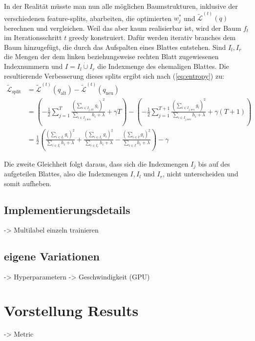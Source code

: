 \documentclass[a4paper,12pt]{scrartcl}
\newcommand{\LL}{\ensuremath{\mathcal{L}}}
\begin{document}
In der Realität müsste man nun alle möglichen Baumstrukturen, inklusive der verschiedenen feature-splits, abarbeiten, die optimierten $w^*_j$ und $\tilde{\LL}^{(t)} (q)$ berechnen und vergleichen. Weil das aber kaum realisierbar ist, wird der Baum $f_t$ im Iterationsschritt $t$ greedy konstruiert. Dafür werden iterativ branches dem Baum hinzugefügt, die durch das Aufspalten eines Blattes entstehen. Sind $I_l, I_r$ die Mengen der dem linken beziehungsweise rechten Blatt zugewiesenen Indexnummern und $I = I_l \dot\cup I_r$ die Indexmenge des ehemaligen Blattes. Die resultierende Verbesserung dieses splits ergibt sich nach (\ref{eq:entropy}) zu:
\begin{equation}
\begin{split}
	\tilde{\LL}_\text{split} &= \tilde{\LL}^{(t)} (q_\text{alt})-\tilde{\LL}^{(t)} (q_\text{neu})\\
	&= \left( - \frac{1}{2} \sum_{j=1}^{T} \frac{(\sum\limits_{i \in I_{j, \text{alt}}} g_i)^2}{\sum\limits_{i \in I_{j, \text{neu}}} h_i + \lambda} + \gamma T \right)- \left( - \frac{1}{2} \sum_{j=1}^{T+1} \frac{(\sum\limits_{i \in I_{j, \text{neu}}} g_i)^2}{\sum\limits_{i \in I_{j, \text{neu}}} h_i + \lambda} + \gamma (T+1) \right)\\	
	&= \frac{1}{2} \left( \frac{(\sum_{i \in I_l} g_i)^2}{\sum_{i \in I_l} h_i + \lambda} + \frac{(\sum_{i \in I_r} g_i)^2}{\sum_{i \in I_r} h_i + \lambda} - \frac{(\sum_{i \in I} g_i)^2}{\sum_{i \in I} h_i + \lambda} \right) - \gamma 
\end{split}
\end{equation}

Die zweite Gleichheit folgt daraus, dass sich die Indexmengen $I_j$ bis auf des aufgeteilen Blattes, also die Indexmengen $I, I_l$ und $I_r$, nicht unterscheiden und somit aufheben. 

\subsection{Implementierungsdetails}
-> Multilabel einzeln trainieren

\subsection{eigene Variationen}
-> Hyperparametern
-> Geschwindigkeit (GPU)


\section{Vorstellung Results}
-> Metric
\end{document}
